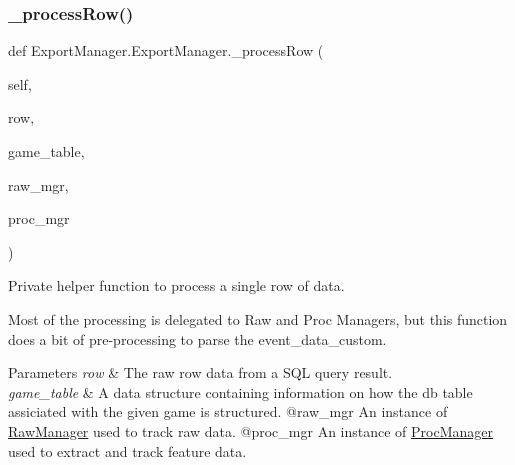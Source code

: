 \subsubsection{\texorpdfstring{\_processRow()}{\_processRow()}}
{\footnotesize\ttfamily def Export\+Manager.\+Export\+Manager.\+\_\+process\+Row (\begin{DoxyParamCaption}\item[{}]{self,  }\item[{typing.\+Tuple}]{row,  }\item[{\mbox{\hyperlink{class_game_table_1_1_game_table}{Game\+Table}}}]{game\+\_\+table,  }\item[{\mbox{\hyperlink{class_raw_manager}{Raw\+Manager}}}]{raw\+\_\+mgr,  }\item[{\mbox{\hyperlink{class_proc_manager}{Proc\+Manager}}}]{proc\+\_\+mgr }\end{DoxyParamCaption})\hspace{0.3cm}{\ttfamily [private]}}



Private helper function to process a single row of data. 

Most of the processing is delegated to Raw and Proc Managers, but this function does a bit of pre-\/processing to parse the event\+\_\+data\+\_\+custom. 
\begin{DoxyParams}{Parameters}
{\em row} & The raw row data from a S\+QL query result. \\
\hline
{\em game\+\_\+table} & A data structure containing information on how the db table assiciated with the given game is structured. @raw\+\_\+mgr An instance of \mbox{\hyperlink{class_raw_manager}{Raw\+Manager}} used to track raw data. @proc\+\_\+mgr An instance of \mbox{\hyperlink{class_proc_manager}{Proc\+Manager}} used to extract and track feature data. \\
\hline
\end{DoxyParams}
\mbox{\label{class_export_manager_1_1_export_manager_a176e2763b0bb0c9628333b0f25697b60}} 

